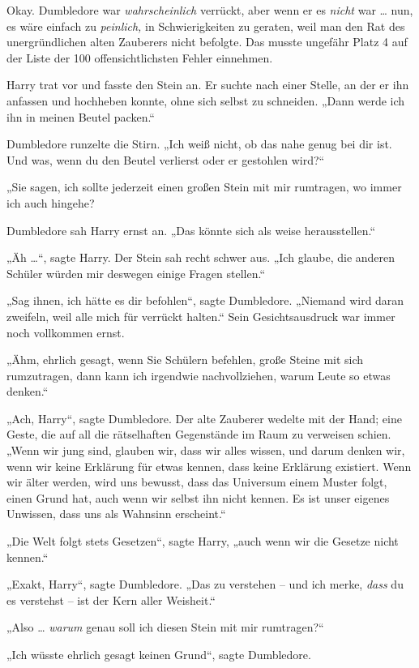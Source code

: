 {Okay. Dumbledore war \emph{wahrscheinlich} verrückt, aber wenn er es \emph{nicht} war … nun, es wäre einfach zu \emph{peinlich,} in Schwierigkeiten zu geraten, weil man den Rat des unergründlichen alten Zauberers nicht befolgte. Das musste ungefähr Platz 4 auf der Liste der 100 offensichtlichsten Fehler einnehmen.

Harry trat vor und fasste den Stein an. Er suchte nach einer Stelle, an der er ihn anfassen und hochheben konnte, ohne sich selbst zu schneiden. „Dann werde ich ihn in meinen Beutel packen.“

Dumbledore runzelte die Stirn. „Ich weiß nicht, ob das nahe genug bei dir ist. Und was, wenn du den Beutel verlierst oder er gestohlen wird?“

„Sie sagen, ich sollte jederzeit einen großen Stein mit mir rumtragen, wo immer ich auch hingehe?

Dumbledore sah Harry ernst an. „Das könnte sich als weise herausstellen.“

„Äh …“, sagte Harry. Der Stein sah recht schwer aus. „Ich glaube, die anderen Schüler würden mir deswegen einige Fragen stellen.“

„Sag ihnen, ich hätte es dir befohlen“, sagte Dumbledore. „Niemand wird daran zweifeln, weil alle mich für verrückt halten.“ Sein Gesichtsausdruck war immer noch vollkommen ernst.

„Ähm, ehrlich gesagt, wenn Sie Schülern befehlen, große Steine mit sich rumzutragen, dann kann ich irgendwie nachvollziehen, warum Leute so etwas denken.“

„Ach, Harry“, sagte Dumbledore. Der alte Zauberer wedelte mit der Hand; eine Geste, die auf all die rätselhaften Gegenstände im Raum zu verweisen schien. „Wenn wir jung sind, glauben wir, dass wir alles wissen, und darum denken wir, wenn wir keine Erklärung für etwas kennen, dass keine Erklärung existiert. Wenn wir älter werden, wird uns bewusst, dass das Universum einem Muster folgt, einen Grund hat, auch wenn wir selbst ihn nicht kennen. Es ist unser eigenes Unwissen, dass uns als Wahnsinn erscheint.“

„Die Welt folgt stets Gesetzen“, sagte Harry, „auch wenn wir die Gesetze nicht kennen.“

„Exakt, Harry“, sagte Dumbledore. „Das zu verstehen -- und ich merke, \emph{dass} du es verstehst -- ist der Kern aller Weisheit.“

„Also … \emph{warum} genau soll ich diesen Stein mit mir rumtragen?“

„Ich wüsste ehrlich gesagt keinen Grund“, sagte Dumbledore.

}
